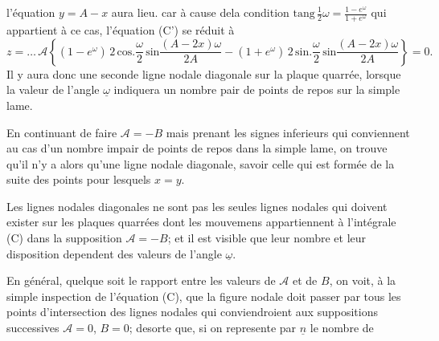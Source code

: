 \documentclass[11pt,a4paper]{article}
\begin{document}
l'équation $y = A - x$ aura lieu. car à cause dela condition
$\text{tang}\,\frac{1}{2}\omega = \frac{1-e^{\omega}}{1+e^{\omega}}$ qui appartient à ce cas, l'équation (C') se
réduit à
\[ z = \ldots\,\mathcal{A}\left\{(1-e^{\omega})\,2\,\text{cos}.\frac{\omega}{2}\,\text{sin}\frac{(A-2x)\omega}{2A} - (1+e^{\omega})\,2\,\text{sin}.\frac{\omega}{2}\,\text{sin}\frac{(A-2x)\omega}{2A}\right\} = 0. \]
Il y aura donc une seconde ligne nodale diagonale sur
la plaque quarrée, lorsque la valeur de l'angle $\underline{\omega}$
indiquera un nombre pair de points de repos sur
la simple lame.

En continuant de faire $\mathcal{A} = -B$ mais prenant les signes
inferieurs qui conviennent au cas d'un nombre impair
de points de repos dans la simple lame, on trouve
qu'il n'y a alors qu'une ligne nodale diagonale, savoir celle
qui est formée de la suite des points pour lesquels $x = y$.

Les lignes nodales diagonales ne sont pas les seules
lignes nodales qui doivent exister sur les plaques
quarrées dont les mouvemens  appartiennent
à l'intégrale (C) dans la supposition $\mathcal{A} = -B$;
et il est visible que leur nombre et leur disposition
dependent des valeurs de l'angle $\underline{\omega}$.

En général, quelque soit le rapport entre les
valeurs de $\mathcal{A}$ et de $B$, on voit, à la simple
inspection de l'équation (C), que la figure
nodale doit passer par tous les points
d'intersection des lignes nodales qui conviendroient
aux suppositions successives $\mathcal{A} = 0$, $B = 0$; desorte
que, si on represente par $\underline{n}$ le nombre de
\end{document}
